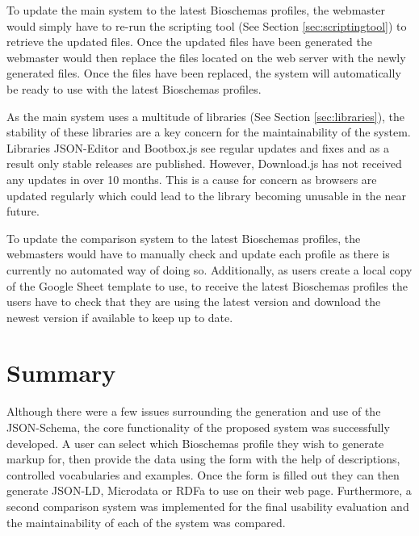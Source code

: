 To update the main system to the latest Bioschemas profiles, the webmaster would simply have to re-run the scripting tool (See Section \ref{sec:scriptingtool}) to retrieve the updated files. Once the updated files have been generated the webmaster would then replace the files located on the web server with the newly generated files. Once the files have been replaced, the system will automatically be ready to use with the latest Bioschemas profiles.

As the main system uses a multitude of libraries (See Section \ref{sec:libraries}), the stability of these libraries are a key concern for the maintainability of the system. Libraries JSON-Editor and Bootbox.js see regular updates and fixes and as a result only stable releases are published. However, Download.js has not received any updates in over 10 months. This is a cause for concern as browsers are updated regularly which could lead to the library becoming unusable in the near future.

To update the comparison system to the latest Bioschemas profiles, the webmasters would have to manually check and update each profile as there is currently no automated way of doing so. Additionally, as users create a local copy of the Google Sheet template to use, to receive the latest Bioschemas profiles the users have to check that they are using the latest version and download the newest version if available to keep up to date.


\section{Summary}
Although there were a few issues surrounding the generation and use of the JSON-Schema, the core functionality of the proposed system was successfully developed. A user can select which Bioschemas profile they wish to generate markup for, then provide the data using the form with the help of descriptions, controlled vocabularies and examples. Once the form is filled out they can then generate JSON-LD, Microdata or RDFa to use on their web page. Furthermore, a second comparison system was implemented for the final usability evaluation and the maintainability of each of the system was compared.